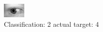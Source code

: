 \begin{figure}[h!]
\begin{center}
\includegraphics[width=0.60\columnwidth]{figures/ID712_class_2_target_4.png}
\end{center}
\caption{ Classification: 2 actual target: 4}
\label{fig:ID712_class_2_target_4}
\end{figure}
